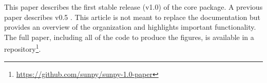 This paper describes the first stable release (v1.0) of the core package.
A previous paper describes v0.5 \citep{Community:2015cy}.
This article is not meant to replace the \sunpypkg documentation but provides an overview of the organization and highlights important functionality.
The full paper, including all of the code to produce the figures, is available in a \github repository\footnote{\url{https://github.com/sunpy/sunpy-1.0-paper}}.